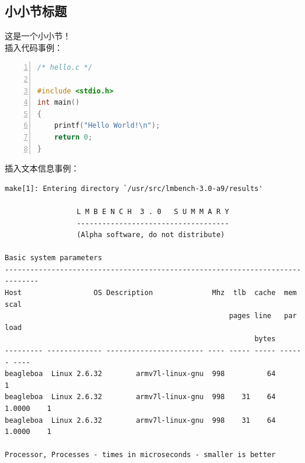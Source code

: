 \documentclass[12pt,openany,a4paper]{report}
\begin{document}
		\subsection{小小节标题}
		这是一个小小节！\\
		插入代码事例：
		\begin{lstlisting}[language=C,numbers=left,numberstyle=\tiny,keywordstyle=\color{blue},frame=shadowbox,rulesepcolor=\color{red!20!green!20!blue!20},commentstyle=\color{red!50!green!50!blue!50!}\selectfont,basicstyle=\ttfamily\fontsize{8}{8}\selectfont]
/* hello.c */

#include <stdio.h>
int main()
{
	printf("Hello World!\n");
	return 0;
}
		\end{lstlisting}

		插入文本信息事例：
						
		{\tiny \begin{verbatim}
make[1]: Entering directory `/usr/src/lmbench-3.0-a9/results'

                 L M B E N C H  3 . 0   S U M M A R Y
                 ------------------------------------
                 (Alpha software, do not distribute)

Basic system parameters
------------------------------------------------------------------------------
Host                 OS Description              Mhz  tlb  cache  mem   scal
                                                     pages line   par   load
                                                           bytes  
--------- ------------- ----------------------- ---- ----- ----- ------ ----
beagleboa  Linux 2.6.32        armv7l-linux-gnu  998          64           1
beagleboa  Linux 2.6.32        armv7l-linux-gnu  998    31    64 1.0000    1
beagleboa  Linux 2.6.32        armv7l-linux-gnu  998    31    64 1.0000    1

Processor, Processes - times in microseconds - smaller is better
		\end{verbatim}}
\end{document}
